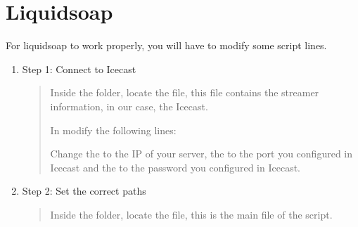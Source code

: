 \documentclass[letterpaper,10pt,english]{sphinxmanual}
\begin{document}
\section{Liquidsoap}
\label{\detokenize{server_config:liquidsoap}}
\sphinxAtStartPar
For liquidsoap to work properly, you will have to modify some script lines.
\begin{enumerate}
%
\item {} 
\sphinxAtStartPar
Step 1: Connect to Icecast
\begin{quote}

\sphinxAtStartPar
Inside the  folder, locate the  file, this file contains the streamer
information, in our case, the Icecast.

\sphinxAtStartPar
In  modify the following lines:

\begin{sphinxVerbatim}[commandchars=\\\{\}]
  
  
  
\end{sphinxVerbatim}

\sphinxAtStartPar
Change the  to the IP of your server, the  to the port you configured in Icecast
and the  to the password you configured in Icecast.
\end{quote}

\item {} 
\sphinxAtStartPar
Step 2: Set the correct paths
\begin{quote}

\sphinxAtStartPar
Inside the  folder, locate the  file, this is the main file of the script.

\begin{sphinxVerbatim}[commandchars=\\\{\}]
\end{sphinxVerbatim}


\end{quote}
\end{enumerate}
\end{document}
